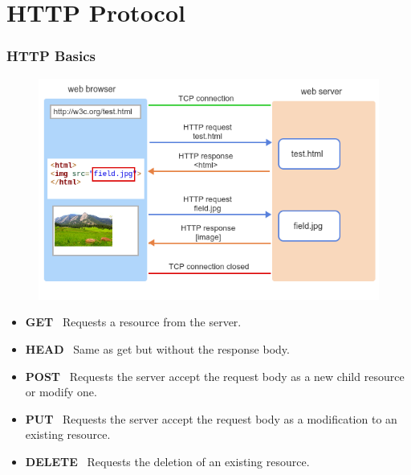 \documentclass{beamer}
\begin{document}
\section{HTTP Protocol}

%
%
\begin{frame}[fragile]
    \frametitle{HTTP Basics}
    \begin{minipage}{0.49\textwidth}
        \begin{figure}
            \includegraphics[width=\textwidth]{./imgs/httprequest.png}
        \end{figure}
    \end{minipage}
    \begin{minipage}{0.49\textwidth}
        {\footnotesize
        \begin{itemize}
            \item \textbf{GET} \textrightarrow \ Requests a resource from the server.
            \item \textbf{HEAD} \textrightarrow \ Same as get but without the response body.
            \item \textbf{POST} \textrightarrow \ Requests the server accept the request body as a new child resource or modify one.
            \item \textbf{PUT} \textrightarrow \ Requests the server accept the request body as a modification to an existing resource.
            \item \textbf{DELETE} \textrightarrow \ Requests the deletion of an existing resource.
        \end{itemize}}
    \end{minipage}
\end{frame}
\end{document}
